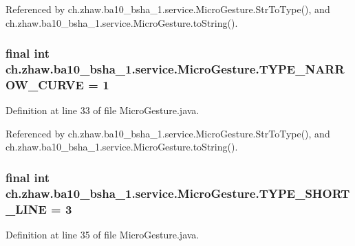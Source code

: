 Referenced by ch.zhaw.ba10\_\-bsha\_\-1.service.MicroGesture.StrToType(), and ch.zhaw.ba10\_\-bsha\_\-1.service.MicroGesture.toString().\hypertarget{classch_1_1zhaw_1_1ba10__bsha__1_1_1service_1_1MicroGesture_a10ec4946fe85b4cce6759af9ed1af09f}{
\subsubsection[{TYPE\_\-NARROW\_\-CURVE}]{\setlength{\rightskip}{0pt plus 5cm}final int {\bf ch.zhaw.ba10\_\-bsha\_\-1.service.MicroGesture.TYPE\_\-NARROW\_\-CURVE} = 1}}
\label{classch_1_1zhaw_1_1ba10__bsha__1_1_1service_1_1MicroGesture_a10ec4946fe85b4cce6759af9ed1af09f}


Definition at line 33 of file MicroGesture.java.

Referenced by ch.zhaw.ba10\_\-bsha\_\-1.service.MicroGesture.StrToType(), and ch.zhaw.ba10\_\-bsha\_\-1.service.MicroGesture.toString().\hypertarget{classch_1_1zhaw_1_1ba10__bsha__1_1_1service_1_1MicroGesture_a028fbfbef81cd5bfd3d2d456d7109ed2}{
\subsubsection[{TYPE\_\-SHORT\_\-LINE}]{\setlength{\rightskip}{0pt plus 5cm}final int {\bf ch.zhaw.ba10\_\-bsha\_\-1.service.MicroGesture.TYPE\_\-SHORT\_\-LINE} = 3}}
\label{classch_1_1zhaw_1_1ba10__bsha__1_1_1service_1_1MicroGesture_a028fbfbef81cd5bfd3d2d456d7109ed2}


Definition at line 35 of file MicroGesture.java.

